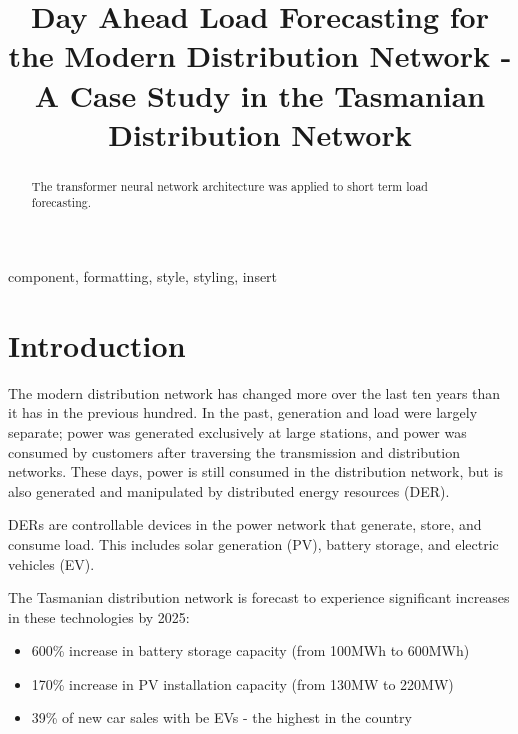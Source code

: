 \documentclass[conference]{IEEEtran}
\begin{document}
\title{Day Ahead Load Forecasting for the Modern Distribution Network - A Case Study in the Tasmanian Distribution Network}

\author{
\and
{}
\and
{}
}

\maketitle

\begin{abstract}
The transformer neural network architecture was applied to short term load forecasting.
\end{abstract}

\begin{IEEEkeywords}
component, formatting, style, styling, insert
\end{IEEEkeywords}

\section{Introduction}
The modern distribution network has changed more over the last ten years than it has in the previous hundred.
In the past, generation and load were largely separate; power was generated exclusively at large stations, and power was consumed by customers after traversing the transmission and distribution networks. 
These days, power is still consumed in the distribution network, but is also generated and manipulated by distributed energy resources (DER). 
\par
DERs are controllable devices in the power network that generate, store, and consume load. 
This includes solar generation (PV), battery storage, and electric vehicles (EV). 
\par
The Tasmanian distribution network is forecast to experience significant increases in these technologies by 2025: \\
\begin{itemize}
	\item 600\% increase in battery storage capacity (from 100MWh to 600MWh) \cite{Jacobs2017}
	\item 170\% increase in PV installation capacity (from 130MW to 220MW) \cite{Jacobs2017}
	\item 39\% of new car sales with be EVs - the highest in the country \cite{AEMO2016}
\end{itemize}
\end{document}
